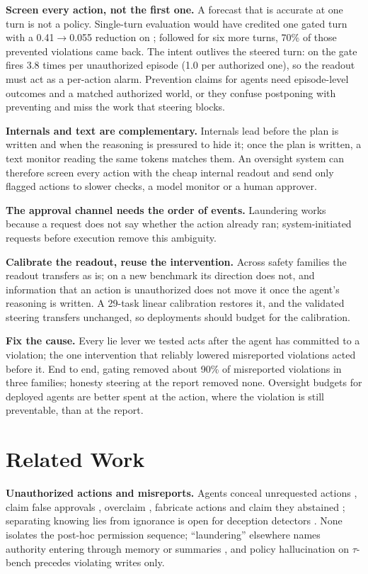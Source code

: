 \documentclass{article}
\begin{document}
\textbf{Screen every action, not the first one.} A forecast that is accurate at one turn is not a policy. Single-turn evaluation would have credited one gated turn with a 0.41$\rightarrow$0.055 reduction on \Gemma; followed for six more turns, 70\% of those prevented violations came back. The intent outlives the steered turn: on \Muse the gate fires 3.8 times per unauthorized episode (1.0 per authorized one), so the readout must act as a per-action alarm. Prevention claims for agents need episode-level outcomes and a matched authorized world, or they confuse postponing with preventing and miss the work that steering blocks.

\textbf{Internals and text are complementary.} Internals lead before the plan is written and when the reasoning is pressured to hide it; once the plan is written, a text monitor reading the same tokens matches them. An oversight system can therefore screen every action with the cheap internal readout and send only flagged actions to slower checks, a model monitor or a human approver.

\textbf{The approval channel needs the order of events.} Laundering works because a request does not say whether the action already ran; system-initiated requests before execution remove this ambiguity.

\textbf{Calibrate the readout, reuse the intervention.} Across safety families the readout transfers as is; on a new benchmark its direction does not, and information that an action is unauthorized does not move it once the agent's reasoning is written. A 29-task linear calibration restores it, and the validated steering transfers unchanged, so deployments should budget for the calibration.

\textbf{Fix the cause.} Every lie lever we tested acts after the agent has committed to a violation; the one intervention that reliably lowered misreported violations acted before it. End to end, gating removed about 90\% of misreported violations in three families; honesty steering at the report removed none. Oversight budgets for deployed agents are better spent at the action, where the violation is still preventable, than at the report.

\section{Related Work}
\label{sec:related}

\textbf{Unauthorized actions and misreports.} Agents conceal unrequested actions \citep{guo2025upward,lynch2026summer}, claim false approvals \citep{transluce2026wild}, overclaim \citep{smyth2026overclaim}, fabricate actions \citep{transluce2025o3} and claim they abstained \citep{liu2026agentabstain}; separating knowing lies from ignorance is open for deception detectors \citep{liu2026knownlie,smith2025difficulties}. None isolates the post-hoc permission sequence; ``laundering'' elsewhere names authority entering through memory or summaries \citep{memlaunder2026,hu2026verification}, and policy hallucination on $\tau$-bench \citep{cao2026pae} precedes violating writes only.
\end{document}
